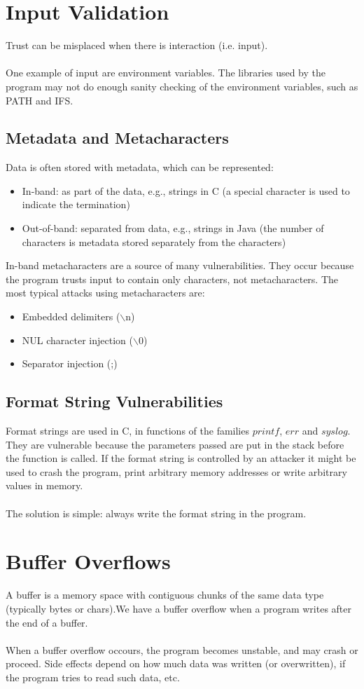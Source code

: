 \documentclass[10pt,a4paper]{report}
\begin{document}
\section{Input Validation}
Trust can be misplaced when there is interaction (i.e. input).\\
\\
One example of input are environment variables. The libraries used by the program may not do enough sanity checking of the environment variables, such as PATH and IFS.
\subsection{Metadata and Metacharacters}
Data is often stored with metadata, which can be represented:
\begin{itemize}
\item In-band: as part of the data, e.g., strings in C (a special character is used to indicate the termination)
\item Out-of-band: separated from data, e.g., strings in Java (the number of characters is metadata stored separately from the characters)
\end{itemize}
In-band metacharacters are a source of many vulnerabilities. They occur because the program trusts input to contain only characters, not metacharacters. The most typical attacks using metacharacters are:
\begin{itemize}
\item Embedded delimiters ($\backslash$n)
\item NUL character injection ($\backslash$0)
\item Separator injection (;)
\end{itemize}
\subsection{Format String Vulnerabilities}
Format strings are used in C, in functions of the families $printf$, $err$ and $syslog$. They are vulnerable because the parameters passed are put in the stack before the function is called. If the format string is controlled by an attacker it might be used to crash the program, print arbitrary memory addresses or write arbitrary values in memory.\\
\\
The solution is simple: always write the format string in the program.

\section{Buffer Overflows}
A buffer is a memory space with contiguous chunks of the same data type (typically bytes or chars).We have a buffer overflow when a program writes after the end of a buffer.\\
\\
When a buffer overflow occours, the program becomes unstable, and may crash or proceed. Side effects depend on how much data was written (or overwritten), if the program tries to read such data, etc.
\end{document}

